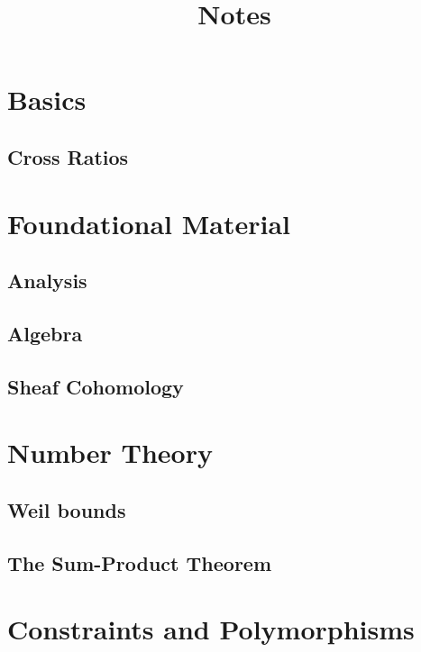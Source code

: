 

\title{Notes}
\date{}
\author{}
\maketitle

\tableofcontents


\part{Basics}

\chapter{Cross Ratios}




\part{Foundational Material}

\chapter{Analysis}




\chapter{Algebra}




\chapter{Sheaf Cohomology}





\part{Number Theory}

\chapter{Weil bounds}




\chapter{The Sum-Product Theorem}




\part{Constraints and Polymorphisms}











